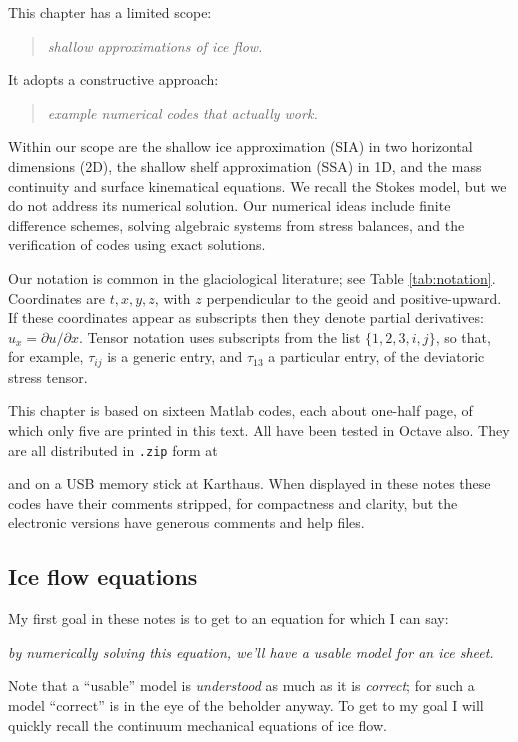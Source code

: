\documentclass[titlepage,a4paper,final,12pt]{scrartcl}
\begin{document}
This chapter has a limited scope:
  \begin{quote}\emph{shallow approximations of ice flow.}\end{quote}
It adopts a constructive approach:
  \begin{quote}\emph{example numerical codes that actually work.}\end{quote}
Within our scope are the shallow ice approximation (SIA) in two horizontal dimensions (2D), the shallow shelf approximation (SSA) in 1D, and the mass continuity and surface kinematical equations.  We recall the Stokes model, but we do not address its numerical solution.  Our numerical ideas include finite difference schemes, solving algebraic systems from stress balances, and the verification of codes using exact solutions.

Our notation is common in the glaciological literature; see Table \ref{tab:notation}.  Coordinates are $t,x,y,z$, with $z$ perpendicular to the geoid and positive-upward.  If these coordinates appear as subscripts then they denote partial derivatives: $u_x = \partial u/\partial x$.  Tensor notation uses subscripts from the list $\{1,2,3,i,j\}$, so that, for example, $\tau_{ij}$ is a generic entry, and $\tau_{13}$ a particular entry, of the deviatoric stress tensor.

This chapter is based on sixteen Matlab codes, each about one-half page, of which only five are printed in this text.  All have been tested in Octave also.  They are all distributed in \texttt{.zip} form at
\begin{quote}
\end{quote}
\noindent and on a USB memory stick at Karthaus.  When displayed in these notes these codes have their comments stripped, for compactness and clarity, but the electronic versions have generous comments and help files.

\subsection{Ice flow equations}

My first goal in these notes is to get to an equation for which I can say:
\begin{center}
\emph{by numerically solving this equation, we'll have a usable model for an ice sheet.}
\end{center}
Note that a ``usable'' model is \emph{understood} as much as it is \emph{correct}; for such a model ``correct'' is in the eye of the beholder anyway.  To get to my goal I will quickly recall the continuum mechanical equations of ice flow.  
\end{document}
